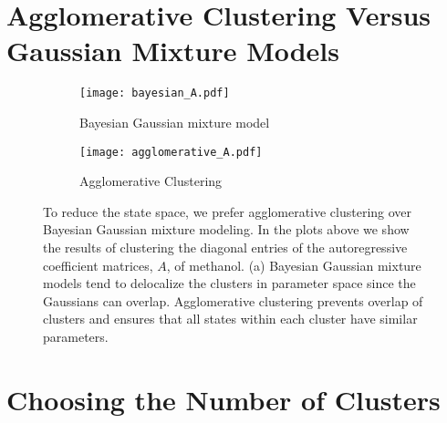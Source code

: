   \clearpage
  
  \section{Agglomerative Clustering Versus Gaussian Mixture Models}\label{section:agglomerative}
  
  
  \begin{figure}[h!]
  \centering
  \begin{subfigure}{0.95\textwidth}
  \texttt{[image: bayesian\_A.pdf]}
  \caption{Bayesian Gaussian mixture model}\label{fig:bayesian_A}
  \end{subfigure}
  \begin{subfigure}{0.95\textwidth}
  \texttt{[image: agglomerative\_A.pdf]}
  \caption{Agglomerative Clustering}\label{fig:agglomerative_A}
  \end{subfigure}
  \caption{To reduce the state space, we prefer agglomerative clustering over Bayesian
  Gaussian mixture modeling. In the plots above we show the results of clustering the
  diagonal entries of the autoregressive coefficient matrices, $A$, of methanol. (a) 
  Bayesian Gaussian mixture models tend to delocalize the clusters in parameter space
  since the Gaussians can overlap. Agglomerative clustering prevents overlap of 
  clusters and ensures that all states within each cluster have similar parameters.
  }\label{fig:clustering_choice}
  \end{figure}
  
  \clearpage
  
  \section{Choosing the Number of Clusters}\label{section:nclusters}

